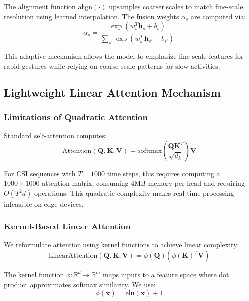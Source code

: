 \documentclass[10pt,journal,compsoc]{IEEEtran}
\begin{document}
The alignment function $\text{align}(\cdot)$ upsamples coarser scales to match fine-scale resolution using learned interpolation. The fusion weights $\alpha_s$ are computed via:
\begin{equation}
\alpha_s = \frac{\exp(w_s^T \mathbf{h}_s + b_s)}{\sum_{s'} \exp(w_{s'}^T \mathbf{h}_{s'} + b_{s'})}
\end{equation}

This adaptive mechanism allows the model to emphasize fine-scale features for rapid gestures while relying on coarse-scale patterns for slow activities.

\subsection{Lightweight Linear Attention Mechanism}

\subsubsection{Limitations of Quadratic Attention}

Standard self-attention computes:
\begin{equation}
\text{Attention}(\mathbf{Q}, \mathbf{K}, \mathbf{V}) = \text{softmax}\left(\frac{\mathbf{Q}\mathbf{K}^T}{\sqrt{d_k}}\right)\mathbf{V}
\end{equation}

For CSI sequences with $T = 1000$ time steps, this requires computing a $1000 \times 1000$ attention matrix, consuming 4MB memory per head and requiring $O(T^2d)$ operations. This quadratic complexity makes real-time processing infeasible on edge devices.

\subsubsection{Kernel-Based Linear Attention}

We reformulate attention using kernel functions to achieve linear complexity:
\begin{equation}
\text{LinearAttention}(\mathbf{Q}, \mathbf{K}, \mathbf{V}) = \phi(\mathbf{Q})(\phi(\mathbf{K})^T\mathbf{V})
\end{equation}

The kernel function $\phi: \mathbb{R}^d \rightarrow \mathbb{R}^m$ maps inputs to a feature space where dot product approximates softmax similarity. We use:
\begin{equation}
\phi(\mathbf{x}) = \text{elu}(\mathbf{x}) + 1
\end{equation}
\end{document}
